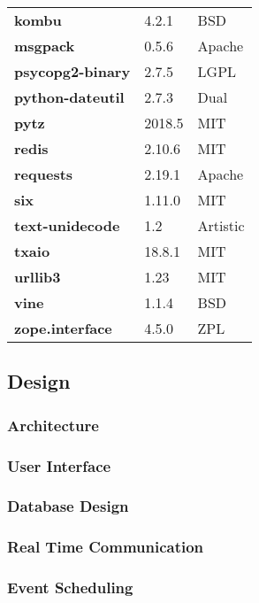 \begin{longtable}{| p{} | p{} | p{} |}
\textbf{kombu} & 4.2.1 & BSD \\
\textbf{msgpack} & 0.5.6 & Apache \\
\textbf{psycopg2-binary} & 2.7.5 & LGPL \\
\textbf{python-dateutil} & 2.7.3 & Dual \\
\textbf{pytz} & 2018.5 & MIT \\
\textbf{redis} & 2.10.6 & MIT \\
\textbf{requests} & 2.19.1 & Apache \\
\textbf{six} & 1.11.0 & MIT \\
\textbf{text-unidecode} & 1.2 & Artistic \\
\textbf{txaio} & 18.8.1 & MIT \\
\textbf{urllib3} & 1.23 & MIT \\
\textbf{vine} & 1.1.4 & BSD \\
\textbf{zope.interface} & 4.5.0 & ZPL \\
\hline
\end{longtable}

\subsection{Design}
\subsubsection{Architecture}
\subsubsection{User Interface}
\subsubsection{Database Design}
\subsubsection{Real Time Communication}
\subsubsection{Event Scheduling}
